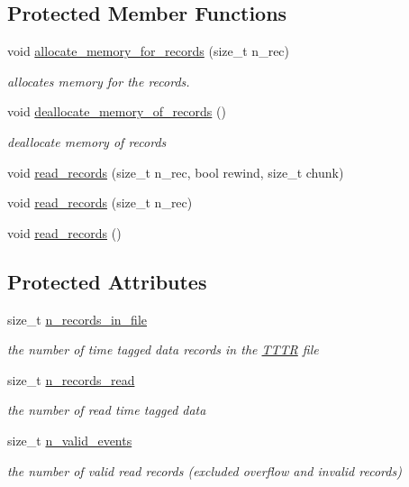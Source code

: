 \subsection*{Protected Member Functions}
\begin{DoxyCompactItemize}
\item 
void \hyperlink{class_t_t_t_r_aca21b423928f92dce134c2b98057cc0a}{allocate\+\_\+memory\+\_\+for\+\_\+records} (size\+\_\+t n\+\_\+rec)
\begin{DoxyCompactList}\small\item\em allocates memory for the records. \end{DoxyCompactList}\item 
void \hyperlink{class_t_t_t_r_af80300e1fdd7ba618dbb33853c832a22}{deallocate\+\_\+memory\+\_\+of\+\_\+records} ()
\begin{DoxyCompactList}\small\item\em deallocate memory of records \end{DoxyCompactList}\item 
void \hyperlink{class_t_t_t_r_a8eb7661d2dc6180a0f69c07810705f4f}{read\+\_\+records} (size\+\_\+t n\+\_\+rec, bool rewind, size\+\_\+t chunk)
\item 
void \hyperlink{class_t_t_t_r_a1b4d9a088a0898de13a964bd6aef02fa}{read\+\_\+records} (size\+\_\+t n\+\_\+rec)
\item 
void \hyperlink{class_t_t_t_r_a202a9bb9bc04ccbb056c1d73893b1c4e}{read\+\_\+records} ()
\end{DoxyCompactItemize}
\subsection*{Protected Attributes}
\begin{DoxyCompactItemize}
\item 
size\+\_\+t \hyperlink{class_t_t_t_r_a019c849293e3d3be29f5f6459bee6181}{n\+\_\+records\+\_\+in\+\_\+file}
\begin{DoxyCompactList}\small\item\em the number of time tagged data records in the \hyperlink{class_t_t_t_r}{T\+T\+TR} file \end{DoxyCompactList}\item 
size\+\_\+t \hyperlink{class_t_t_t_r_a4cc37548f6564c05496d95ca1b25b2d4}{n\+\_\+records\+\_\+read}
\begin{DoxyCompactList}\small\item\em the number of read time tagged data \end{DoxyCompactList}\item 
size\+\_\+t \hyperlink{class_t_t_t_r_aabb647d22bb6cb17ff1b843c93b9de3a}{n\+\_\+valid\+\_\+events}
\begin{DoxyCompactList}\small\item\em the number of valid read records (excluded overflow and invalid records) \end{DoxyCompactList}\end{DoxyCompactItemize}


